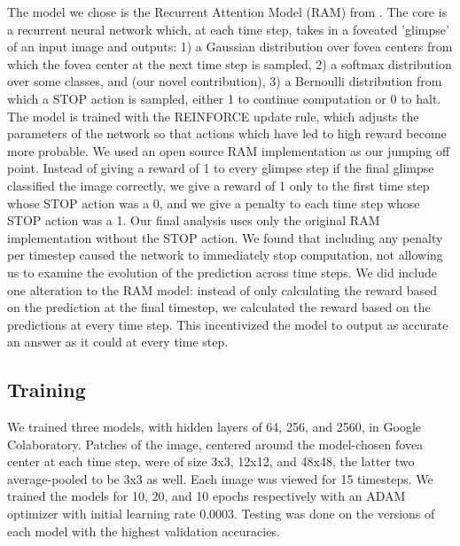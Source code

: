 \documentclass{article}
\begin{document}
The model we chose is the Recurrent Attention Model (RAM) from \cite{deepmind}. The core is a recurrent neural network which, at each time step, takes in a foveated 'glimpse' of an input image and outputs: 1) a Gaussian distribution over fovea centers from which the fovea center at the next time step is sampled, 2) a softmax distribution over some classes, and (our novel contribution), 3) a Bernoulli distribution from which a STOP action is sampled, either 1 to continue computation or 0 to halt. The model is trained with the REINFORCE update rule, which adjusts the parameters of the network so that actions which have led to high reward become more probable.\newline
We used an open source RAM implementation \cite{kevinzakka} as our jumping off point. Instead of giving a reward of 1 to every glimpse step if the final glimpse classified the image correctly, we give a reward of 1 only to the first time step whose STOP action was a 0, and we give a penalty to each time step whose STOP action was a 1. \newline
Our final analysis uses only the original RAM implementation without the STOP action. We found that including any penalty per timestep caused the network to immediately stop computation, not allowing us to examine the evolution of the prediction across time steps. We did include one alteration to the RAM model: instead of only calculating the reward based on the prediction at the final timestep, we calculated the reward based on the predictions at every time step. This incentivized the model to output as accurate an answer as it could at every time step.\newline
\subsection{Training}
We trained three models, with hidden layers of 64, 256, and 2560, in Google Colaboratory. Patches of the image, centered around the model-chosen fovea center at each time step, were of size 3x3, 12x12, and 48x48, the latter two average-pooled to be 3x3 as well. Each image was viewed for 15 timesteps. We trained the models for 10, 20, and 10 epochs respectively with an ADAM optimizer with initial learning rate 0.0003. Testing was done on the versions of each model with the highest validation accuracies.
\end{document}
